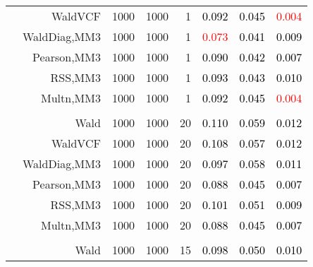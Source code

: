 \documentclass[
]{article}
\begin{document}
\begin{table}[H]
{\begin{tabular}[t]{lrrrrrrr}
\hspace{1em} & WaldVCF & 1000 & 1000 & 1 & \textcolor{black}{0.092} & \textcolor{black}{0.045} & \textcolor{red}{0.004}\\

\hspace{1em} & WaldDiag,MM3 & 1000 & 1000 & 1 & \textcolor{red}{0.073} & \textcolor{black}{0.041} & \textcolor{black}{0.009}\\

\hspace{1em} & Pearson,MM3 & 1000 & 1000 & 1 & \textcolor{black}{0.090} & \textcolor{black}{0.042} & \textcolor{black}{0.007}\\

\hspace{1em} & RSS,MM3 & 1000 & 1000 & 1 & \textcolor{black}{0.093} & \textcolor{black}{0.043} & \textcolor{black}{0.010}\\

\hspace{1em} & Multn,MM3 & 1000 & 1000 & 1 & \textcolor{black}{0.092} & \textcolor{black}{0.045} & \textcolor{red}{0.004}\\
\cmidrule{1-8}
\addlinespace[0.3em]
\multicolumn{8}{l}{\textbf{1F 15V}}\\
\hspace{1em} & Wald & 1000 & 1000 & 20 & \textcolor{black}{0.110} & \textcolor{black}{0.059} & \textcolor{black}{0.012}\\

\hspace{1em} & WaldVCF & 1000 & 1000 & 20 & \textcolor{black}{0.108} & \textcolor{black}{0.057} & \textcolor{black}{0.012}\\

\hspace{1em} & WaldDiag,MM3 & 1000 & 1000 & 20 & \textcolor{black}{0.097} & \textcolor{black}{0.058} & \textcolor{black}{0.011}\\

\hspace{1em} & Pearson,MM3 & 1000 & 1000 & 20 & \textcolor{black}{0.088} & \textcolor{black}{0.045} & \textcolor{black}{0.007}\\

\hspace{1em} & RSS,MM3 & 1000 & 1000 & 20 & \textcolor{black}{0.101} & \textcolor{black}{0.051} & \textcolor{black}{0.009}\\

\hspace{1em} & Multn,MM3 & 1000 & 1000 & 20 & \textcolor{black}{0.088} & \textcolor{black}{0.045} & \textcolor{black}{0.007}\\
\cmidrule{1-8}
\addlinespace[0.3em]
\multicolumn{8}{l}{\textbf{2F 10V}}\\
\hspace{1em} & Wald & 1000 & 1000 & 15 & \textcolor{black}{0.098} & \textcolor{black}{0.050} & \textcolor{black}{0.010}\\


\end{tabular}}
\end{table}
\end{document}
